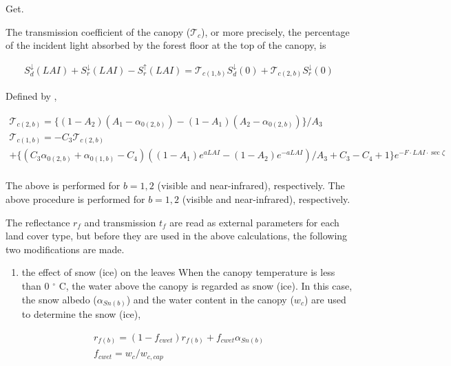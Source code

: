 Get.

The transmission coefficient of the canopy (\({\mathcal{T}}_c\)), or
more precisely, the percentage of the incident light absorbed by the
forest floor at the top of the canopy, is

\begin{eqnarray}
 S^{\downarrow}_d(LAI) + S^{\downarrow}_r(LAI) - S^{\uparrow}_r(LAI)
= {\mathcal{T}}_{c(1,b)} S^{\downarrow}_d(0)
+ {\mathcal{T}}_{c(2,b)} S^{\downarrow}_r(0)
\end{eqnarray}

Defined by ,

\begin{eqnarray}
  {\mathcal{T}}_{c(2,b)}= \{ ( 1 - A_2 )( A_1 - \alpha_{0(2,b)} )
                      - ( 1 - A_1 )( A_2 - \alpha_{0(2,b)} ) \} / A_3 \\
 {\mathcal{T}}_{c(1,b)}= - C_3 {\mathcal{T}}_{c(2,b)}  \\
 +               \{ ( C_3 \alpha_{0(2,b)} + \alpha_{0(1,b)} -C_4 )
                   ( ( 1 - A_1 ) e^{ a LAI }
                   - ( 1 - A_2 ) e^{-a LAI } )  / A_3
                   + C_3 - C_4 +1 \} e^{- F\cdot LAI\cdot \sec\zeta}
 \\
\end{eqnarray}

The above is performed for \(b=1, 2\) (visible and near-infrared),
respectively. The above procedure is performed for \(b=1, 2\) (visible
and near-infrared), respectively.

The reflectance \(r_f\) and transmission \(t_f\) are read as external
parameters for each land cover type, but before they are used in the
above calculations, the following two modifications are made.

\begin{enumerate}
\def\labelenumi{\arabic{enumi}.}
\tightlist
\item
  the effect of snow (ice) on the leaves When the canopy temperature is
  less than 0 \(^{\circ}\) C, the water above the canopy is regarded as
  snow (ice). In this case, the snow albedo (\(\alpha_{Sn(b)}\)) and the
  water content in the canopy (\(w_c\)) are used to determine the snow
  (ice),
\end{enumerate}

\begin{eqnarray}
 r_{f(b)} = ( 1 - f_{cwet} ) r_{f(b)}
         + f_{cwet} \alpha_{Sn(b)} \\
  f_{cwet} = {w_c}/w_{c,cap}
\end{eqnarray}

